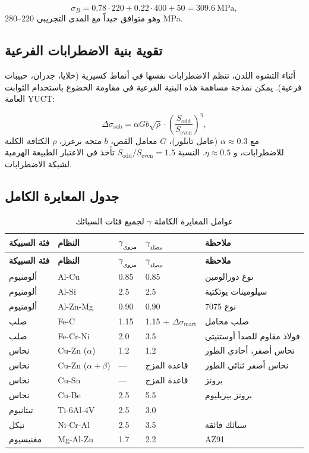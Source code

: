 \documentclass[11pt,a4paper]{article}
\begin{document}
\begin{otherlanguage}{arabic}
		\[
		\sigma_B = 0.78 \cdot 220 + 0.22 \cdot 400 + 50 = 309.6\ \text{MPa},
		\]
		وهو متوافق جيداً مع المدى التجريبي 220–280 MPa.
		
		\subsection{تقوية بنية الاضطرابات الفرعية}
		\label{subsec:dislocation-substructure}
		
		أثناء التشوه اللدن، تنظم الاضطرابات نفسها في أنماط كسيرية (خلايا، جدران، حبيبات فرعية). يمكن نمذجة مساهمة هذه البنية الفرعية في مقاومة الخضوع باستخدام الثوابت العامة YUCT:
		
		\[
		\Delta\sigma_{\text{sub}} = \alpha G b \sqrt{\rho} \cdot \left( \frac{S_{\text{odd}}}{S_{\text{even}}} \right)^{\eta},
		\]
		مع \(\alpha \approx 0.3\) (عامل تايلور)، \(G\) معامل القص، \(b\) متجه برغرز، \(\rho\) الكثافة الكلية للاضطرابات، و \(\eta \approx 0.5\). النسبة \(S_{\text{odd}}/S_{\text{even}}=1.5\) تأخذ في الاعتبار الطبيعة الهرمية لشبكة الاضطرابات.
		
		\subsection{جدول المعايرة الكامل}
		\label{subsec:complete-calibration}
		
		\begin{longtable}{p{3cm}p{2.5cm}p{2.5cm}p{2.5cm}p{4cm}}
			\caption{عوامل المعايرة الكاملة \(\gamma\) لجميع فئات السبائك} \label{tab:complete-gamma} \\
			\toprule
			\textbf{فئة السبيكة} & \textbf{النظام} & \(\gamma_{\text{مروى}}\) & \(\gamma_{\text{مصلد}}\) & \textbf{ملاحظة} \\
			\midrule
			\endfirsthead
			\toprule
			\textbf{فئة السبيكة} & \textbf{النظام} & \(\gamma_{\text{مروى}}\) & \(\gamma_{\text{مصلد}}\) & \textbf{ملاحظة} \\
			\midrule
			\endhead
			ألومنيوم & Al-Cu & 0.85 & 0.85 & نوع دورالومين \\
			ألومنيوم & Al-Si & 2.5 & 2.5 & سيلومينات يوتكتية \\
			ألومنيوم & Al-Zn-Mg & 0.90 & 0.90 & نوع 7075 \\
			صلب & Fe-C & 1.15 & 1.15 + \(\Delta\sigma_{\text{mart}}\) & صلب محامل \\
			صلب & Fe-Cr-Ni & 2.0 & 3.5 & فولاذ مقاوم للصدأ أوستنيتي \\
			نحاس & Cu-Zn (\(\alpha\)) & 1.2 & 1.2 & نحاس أصفر، أحادي الطور \\
			نحاس & Cu-Zn (\(\alpha+\beta\)) & — & قاعدة المزج & نحاس أصفر ثنائي الطور \\
			نحاس & Cu-Sn & — & قاعدة المزج & برونز \\
			نحاس & Cu-Be & 2.5 & 5.5 & برونز بيريليوم \\
			تيتانيوم & Ti-6Al-4V & 2.5 & 3.0 & \\
			نيكل & Ni-Cr-Al & 2.5 & 3.5 & سبائك فائقة \\
			مغنيسيوم & Mg-Al-Zn & 1.7 & 2.2 & AZ91 \\
			\bottomrule
		\end{longtable}
		

\end{otherlanguage}
\end{document}
